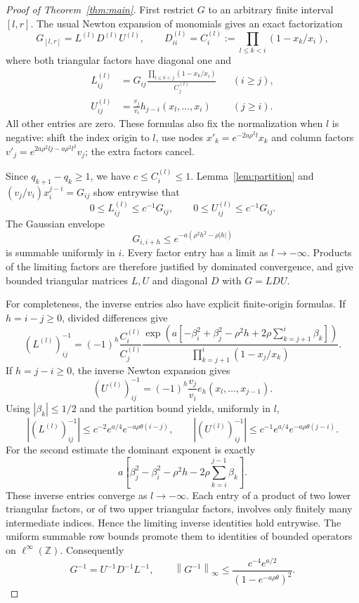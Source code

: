 \documentclass[11pt]{article}
\newcommand{\norm}[1]{\left\lVert#1\right\rVert_\infty}
\newcommand{\Z}{\mathbb Z}
\begin{document}
\begin{proof}[Proof of Theorem~\ref{thm:main}]
First restrict $G$ to an arbitrary finite interval $[l,r]$.
The usual Newton expansion of monomials gives an exact factorization
\[
 G_{[l,r]}=L^{(l)}D^{(l)}U^{(l)},\qquad
 D^{(l)}_{ii}=C_i^{(l)}:=\prod_{l\le k<i}(1-x_k/x_i),
\]
where both triangular factors have diagonal one and
\begin{align*}
 L^{(l)}_{ij}
 &=G_{ij}\frac{\prod_{l\le k<j}(1-x_k/x_i)}{C_j^{(l)}}
 &&(i\ge j),\\
 U^{(l)}_{ij}
 &=\frac{v_j}{v_i}h_{j-i}(x_l,\ldots,x_i)
 &&(j\ge i).
\end{align*}
All other entries are zero. These formulas also fix the normalization
when $l$ is negative: shift the index origin to $l$, use nodes
$x'_k=e^{-2a\rho^2l}x_k$ and column factors
$v'_j=e^{2a\rho^2lj-a\rho^2l^2}v_j$; the extra factors cancel.

Since $q_{k+1}-q_k\ge1$, we have $c\le C_i^{(l)}\le1$.
Lemma~\ref{lem:partition} and
$(v_j/v_i)x_i^{j-i}=G_{ij}$ show entrywise that
\[
 0\le L^{(l)}_{ij}\le c^{-1}G_{ij},\qquad
 0\le U^{(l)}_{ij}\le c^{-1}G_{ij}.
\]
The Gaussian envelope
\[
 G_{i,i+h}\le e^{-a(\rho^2h^2-\rho|h|)}
\]
is summable uniformly in $i$. Every factor entry has a limit as
$l\to-\infty$. Products of the limiting factors are therefore justified
by dominated convergence, and give bounded triangular matrices $L,U$
and diagonal $D$ with $G=LDU$.

For completeness, the inverse entries also have explicit finite-origin
formulas. If $h=i-j\ge0$, divided differences give
\[
 (L^{(l)})^{-1}_{ij}
 =(-1)^h\frac{C_i^{(l)}}{C_j^{(l)}}
 \frac{\exp\!\left(a[-\beta_i^2+\beta_j^2-\rho^2h
              +2\rho\sum_{k=j+1}^{i}\beta_k]\right)}
      {\prod_{k=j+1}^{i}(1-x_j/x_k)}.
\]
If $h=j-i\ge0$, the inverse Newton expansion gives
\[
 (U^{(l)})^{-1}_{ij}
 =(-1)^h\frac{v_j}{v_i}e_h(x_l,\ldots,x_{j-1}).
\]
Using $|\beta_k|\le1/2$ and the partition bound yields, uniformly in $l$,
\[
 |(L^{(l)})^{-1}_{ij}|
 \le c^{-2}e^{a/4}e^{-a\rho\theta(i-j)},\qquad
 |(U^{(l)})^{-1}_{ij}|
 \le c^{-1}e^{a/4}e^{-a\rho\theta(j-i)}.
\]
For the second estimate the dominant exponent is exactly
\[
 a\left[\beta_j^2-\beta_i^2-\rho^2h
               -2\rho\sum_{k=i}^{j-1}\beta_k\right].
\]
These inverse entries converge as $l\to-\infty$. Each entry of a
product of two lower triangular factors, or of two upper triangular
factors, involves only finitely many intermediate indices. Hence the
limiting inverse identities hold entrywise. The uniform summable row
bounds promote them to identities of bounded operators on
$\ell^\infty(\Z)$. Consequently
\[
 G^{-1}=U^{-1}D^{-1}L^{-1},\qquad
 \norm{G^{-1}}
 \le\frac{c^{-4}e^{a/2}}{(1-e^{-a\rho\theta})^2}.
\]


\end{proof}
\end{document}
